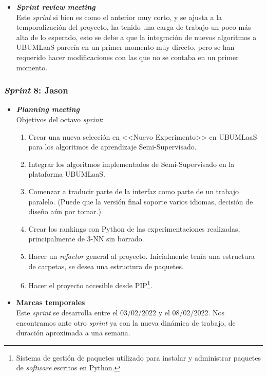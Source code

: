 \begin{itemize}
\item \textbf{\textit{Sprint review meeting}}\\
Este \textit{sprint} si bien es como el anterior muy corto, y se ajusta a la temporalización del proyecto, ha tenido una carga de trabajo un poco más alta de lo esperado, esto se debe a que la integración de nuevos algoritmos a UBUMLaaS parecía en un primer momento muy directo, pero se han requerido hacer modificaciones con las que no se contaba en un primer momento.

\end{itemize}

\subsubsection{\textit{Sprint} 8: Jason}
\begin{itemize}
\item \textbf{\textit{Planning meeting}}\\
Objetivos del octavo \textit{sprint}:
\begin{enumerate}
\item Crear una nueva selección en <<Nuevo Experimento>> en UBUMLaaS para los algoritmos de aprendizaje Semi-Supervisado.
\item Integrar los algoritmos implementados de Semi-Supervisado en la plataforma UBUMLaaS.
\item Comenzar a traducir parte de la interfaz como parte de un trabajo paralelo. (Puede que la versión final soporte varios idiomas, decisión de diseño aún por tomar.)
\item Crear los rankings con Python de las experimentaciones realizadas, principalmente de 3-NN sin borrado.
\item Hacer un \textit{refactor} general al proyecto. Inicialmente tenía una estructura de carpetas, se desea una estructura de paquetes.
\item Hacer el proyecto accesible desde PIP\footnote{Sistema de gestión de paquetes utilizado para instalar y administrar paquetes de \textit{software} escritos en Python.}.
\end{enumerate}

\item \textbf{Marcas temporales}\\
Este \textit{sprint} se desarrolla entre el 03/02/2022 y el 08/02/2022. Nos encontramos ante otro \textit{sprint} ya con la nueva dinámica de trabajo, de duración aproximada a una semana.


\end{itemize}
